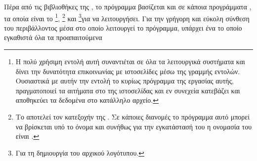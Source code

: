 \documentclass[12pt]{report}
\begin{document}
Πέρα από τις βιβλιοθήκες της {}, το πρόγραμμα βασίζεται και σε κάποια προγράμματα {}, τα οποία είναι το {}\footnote{Η πολύ χρήσιμη εντολή αυτή συναντιέται σε όλα τα λειτουργικά 
συστήματα και δίνει την δυνατότητα επικοινωνίας με ιστοσελίδες μέσω της γραμμής εντολών. Ουσιαστικά με αυτήν την εντολή το κυρίως πρόγραμμα της εργασίας αυτής, πραγματοποιεί τα αιτήματα στο {} της ιστοσελίδας και εν
συνεχεία κατεβάζει και αποθηκεύει τα δεδομένα στο κατάλληλο αρχείο.}, {}\footnote{Το {} αποτελεί τον κατεξοχήν {} της {}. Σε κάποιες διανομές 
{} το πρόγραμμα αυτό μπορεί να βρίσκεται υπό το όνομα {} και συνήθως για την εγκατάστασή του η ονομασία του είναι {}.} και {}\footnote{Για τη δημιουργία του 
αρχικού λογότυπου.}για να λειτουργήσει. Για την γρήγορη και εύκολη σύνθεση του περιβάλλοντος μέσα στο οποίο λειτουργεί το πρόγραμμα, υπάρχει ένα {} το οποίο εγκαθιστά όλα τα προαπαιτούμενα 
\end{document}
